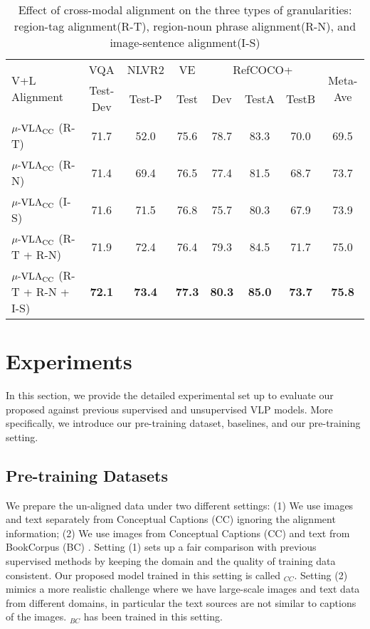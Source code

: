 \begin{table*}[!ht]\centering
\small
\begin{tabular}{l|c|c|c|ccc|c}\toprule
\multirow{2}{*}{V+L Alignment} &VQA &NLVR2 &VE &\multicolumn{3}{c|}{RefCOCO+} & \multirow{2}{*}{Meta-Ave}\\
&Test-Dev &Test-P &Test &Dev &TestA &TestB & \\\cmidrule{1-8}
$\text{$\mu$-VLA}_{\text{CC}}$ (R-T)  &71.7 &52.0 &75.6 &78.7 &83.3 &70.0 & 69.5\\
$\text{$\mu$-VLA}_{\text{CC}}$ (R-N)  &71.4 &69.4 &76.5 &77.4 &81.5 & 68.7 & 73.7 \\
$\text{$\mu$-VLA}_{\text{CC}}$ (I-S)  &71.6 &71.5 &76.8 &75.7 &80.3 &67.9 & 73.9\\
$\text{$\mu$-VLA}_{\text{CC}}$ (R-T + R-N) &71.9 &72.4 &76.4 &79.3 & 84.5 & 71.7 & 75.0 \\
$\text{$\mu$-VLA}_{\text{CC}}$ (R-T + R-N + I-S) &\textbf{72.1} & \textbf{73.4} &\textbf{77.3} &\textbf{80.3} & \textbf{85.0} &\textbf{73.7} & \textbf{75.8}\\
\bottomrule
\end{tabular}
\caption{Effect of cross-modal alignment on the three types of granularities: region-tag alignment(R-T), region-noun phrase alignment(R-N), and image-sentence alignment(I-S)}\label{tab:ablation_align}
\end{table*}


\section{Experiments}
In this section, we provide the detailed experimental set up to evaluate our proposed {\ModelName } against previous supervised and unsupervised VLP models. More specifically, we introduce our pre-training dataset, baselines, and our pre-training setting.

\subsection{Pre-training Datasets}
We prepare the un-aligned data under two different settings: (1) We use images and text separately from Conceptual Captions (CC) \cite{sharma2018conceptual} ignoring the alignment information; (2) We use images from Conceptual Captions (CC) \cite{sharma2018conceptual} and text from BookCorpus (BC) \cite{Zhu_2015_ICCV}. 
Setting (1) sets up a fair comparison with previous supervised methods by keeping the domain and the quality of training data consistent. Our proposed model trained in this setting is called \ModelName$_{CC}$. 
Setting (2) mimics a more realistic challenge where we have large-scale images and text data from different domains, in particular the text sources are not similar to captions of the images. \ModelName$_{BC}$ has been trained in this setting.

